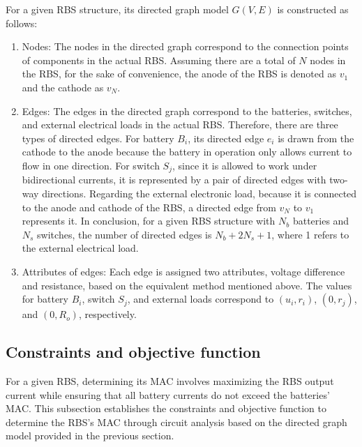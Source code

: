 \documentclass{article}
\begin{document}
For a given RBS structure, its directed graph model $G(V,E)$ is constructed as follows:
\begin{enumerate}
    \item Nodes:
        The nodes in the directed graph correspond to the connection points of components in the actual RBS. 
        Assuming there are a total of $N$ nodes in the RBS, for the sake of convenience, the anode of the RBS is denoted as $v_1$ and the cathode as $v_N$.
    \item Edges:
        The edges in the directed graph correspond to the batteries, switches, and external electrical loads in the actual RBS.
        Therefore, there are three types of directed edges. 
        For battery $B_i$, its directed edge $e_i$ is drawn from the cathode to the anode because the battery in operation only allows current to flow in one direction.
        For switch $S_j$, since it is allowed to work under bidirectional currents, it is represented by a pair of directed edges with two-way directions. 
        Regarding the external electronic load, because it is connected to the anode and cathode of the RBS, a directed edge from $v_N$ to $v_1$  represents it. 
        In conclusion, for a given RBS structure with $N_b$ batteries and $N_s$ switches, the number of directed edges is $N_b+2N_s+1$, where 1 refers to the external electrical load.
    \item Attributes of edges:
        Each edge is assigned two attributes, voltage difference and resistance, based on the equivalent method mentioned above.
        The values for  battery $B_i$, switch $S_j$, and external loads correspond to $(u_i, r_i)$, $(0, r_j)$, and $(0, R_o)$, respectively.
\end{enumerate}

\subsection{Constraints and objective function}

For a given RBS, determining its MAC involves maximizing the RBS output current while ensuring that all battery currents do not exceed the batteries' MAC. 
This subsection establishes the constraints and objective function to determine the RBS's MAC through circuit analysis based on the directed graph model provided in the previous section.
\end{document}

